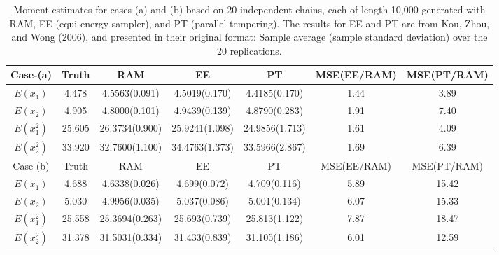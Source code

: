 \documentclass{article}
\begin{document}
\begin{table}[H]
\caption{Moment estimates for cases (a) and (b) based on 20 independent chains, each of length 10,000 generated with RAM, EE (equi-energy sampler), and PT (parallel
tempering). The results for EE and PT are from Kou, Zhou, and Wong (2006), and presented in their original format: Sample average (sample standard deviation) over the
20 replications.} %
\centering %
\begin{tabular}{c c c c c c c} %
\hline\hline %
Case-(a) & Truth & RAM & EE & PT & \small{MSE(EE/RAM)} & \small{MSE(PT/RAM)} \\ [0.5ex] %
\hline %
$E(x_1)$ & 4.478 & 4.5563(0.091) & 4.5019(0.170) & 4.4185(0.170) & 1.44 & 3.89 \\ [1ex]%
$E(x_2)$ & 4.905 & 4.8000(0.101) & 4.9439(0.139) & 4.8790(0.283) & 1.91 & 7.40 \\[1ex]
$E(x_1^2)$ & 25.605 & 26.3734(0.900) & 25.9241(1.098) & 24.9856(1.713) & 1.61 &4.09 \\[1ex]
$E(x_2^2)$ & 33.920 & 32.7600(1.100) & 34.4763(1.373) & 33.5966(2.867) & 1.69 & 6.39 \\[1ex] %
\hline %
Case-(b) & Truth & RAM & EE & PT & \small{MSE(EE/RAM)} & \small{MSE(PT/RAM)} \\ [0.5ex] %
\hline %
$E(x_1)$ & 4.688 & 4.6338(0.026) & 4.699(0.072) & 4.709(0.116) & 5.89 & 15.42 \\ [1ex]%
$E(x_2)$ & 5.030 & 4.9956(0.035) & 5.037(0.086) & 5.001(0.134) & 6.07 & 15.33 \\[1ex]
$E(x_1^2)$ & 25.558 & 25.3694(0.263) & 25.693(0.739) & 25.813(1.122) & 7.87 &18.47 \\[1ex]
$E(x_2^2)$ & 31.378 & 31.5031(0.334) & 31.433(0.839) & 31.105(1.186) & 6.01 & 12.59 \\[1ex] %
\end{tabular}
\label{table:nonlin} %
\end{table}
\end{document}
